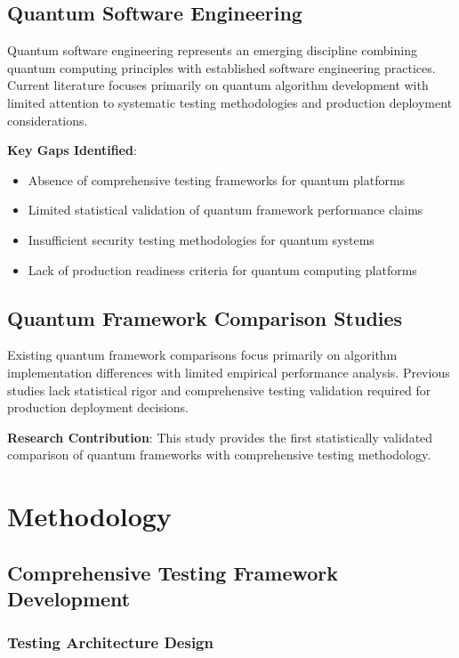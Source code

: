 \documentclass[12pt,a4paper]{article}
\begin{document}
\subsection{Quantum Software Engineering}

Quantum software engineering represents an emerging discipline combining quantum computing principles with established software engineering practices. Current literature focuses primarily on quantum algorithm development with limited attention to systematic testing methodologies and production deployment considerations.

\textbf{Key Gaps Identified}:
\begin{itemize}
\item Absence of comprehensive testing frameworks for quantum platforms
\item Limited statistical validation of quantum framework performance claims
\item Insufficient security testing methodologies for quantum systems
\item Lack of production readiness criteria for quantum computing platforms
\end{itemize}

\subsection{Quantum Framework Comparison Studies}

Existing quantum framework comparisons focus primarily on algorithm implementation differences with limited empirical performance analysis. Previous studies lack statistical rigor and comprehensive testing validation required for production deployment decisions.

\textbf{Research Contribution}: This study provides the first statistically validated comparison of quantum frameworks with comprehensive testing methodology.

\section{Methodology}

\subsection{Comprehensive Testing Framework Development}

\subsubsection{Testing Architecture Design}
\end{document}

